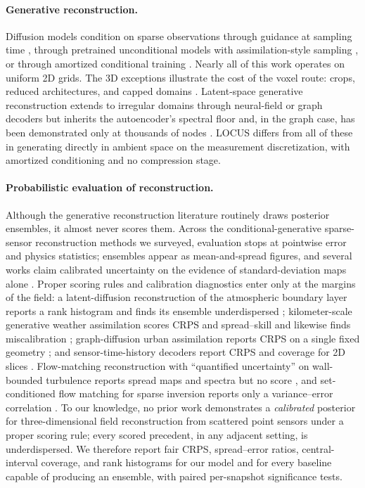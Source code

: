 \documentclass{article} %
\newcommand{\model}{LOCUS}
\begin{document}
\paragraph{Generative reconstruction.}
Diffusion models condition on sparse observations through guidance at sampling time \citep{shu2023physics,huang2024diffusionpde,amoros2026guiding,chung2023diffusion,rozet2023score}, through pretrained unconditional models with assimilation-style sampling \citep{li2024s3gm}, or through amortized conditional training \citep{zhuang2025spatially,liu2024uncertainty}. Nearly all of this work operates on uniform 2D grids. The 3D exceptions illustrate the cost of the voxel route: crops, reduced architectures, and capped domains \citep{oommen2026turbulent,lienen2024zero}. Latent-space generative reconstruction \citep{du2024confild,zhou2025text2pde,lino2025dgn} extends to irregular domains through neural-field or graph decoders but inherits the autoencoder's spectral floor \citep{rafiq2026spectrally,glaws2020deep} and, in the graph case, has been demonstrated only at thousands of nodes \citep{lino2025dgn}. \model{} differs from all of these in generating directly in ambient space on the measurement discretization, with amortized conditioning and no compression stage.

\paragraph{Probabilistic evaluation of reconstruction.}
Although the generative reconstruction literature routinely draws posterior ensembles, it almost never scores them. Across the conditional-generative sparse-sensor reconstruction methods we surveyed, evaluation stops at pointwise error and physics statistics; ensembles appear as mean-and-spread figures, and several works claim calibrated uncertainty on the evidence of standard-deviation maps alone \citep{wang2025geofunflow}. Proper scoring rules and calibration diagnostics \citep{gneiting2007strictly} enter only at the margins of the field: a latent-diffusion reconstruction of the atmospheric boundary layer reports a rank histogram and finds its ensemble underdispersed \citep{rybchuk2023ensemble}; kilometer-scale generative weather assimilation scores CRPS and spread--skill and likewise finds miscalibration \citep{manshausen2025generative}; graph-diffusion urban assimilation reports CRPS on a single fixed geometry \citep{giral2026genda}; and sensor-time-history decoders report CRPS and coverage for 2D slices \citep{gao2026uqshred}. Flow-matching reconstruction with ``quantified uncertainty'' on wall-bounded turbulence reports spread maps and spectra but no score \citep{parikh2026conditional}, and set-conditioned flow matching for sparse inversion reports only a variance--error correlation \citep{yang2025pis}. To our knowledge, no prior work demonstrates a \emph{calibrated} posterior for three-dimensional field reconstruction from scattered point sensors under a proper scoring rule; every scored precedent, in any adjacent setting, is underdispersed. We therefore report fair CRPS, spread--error ratios, central-interval coverage, and rank histograms for our model and for every baseline capable of producing an ensemble, with paired per-snapshot significance tests.
\end{document}
